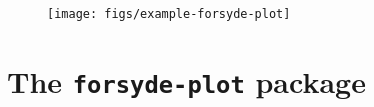 \begin{figure}[htb]\centering
\texttt{[image: figs/example-forsyde-plot]}
\end{figure}

\newpage

\section{The \texttt{forsyde-plot} package}
\label{sec:forsyde-plot-package}


